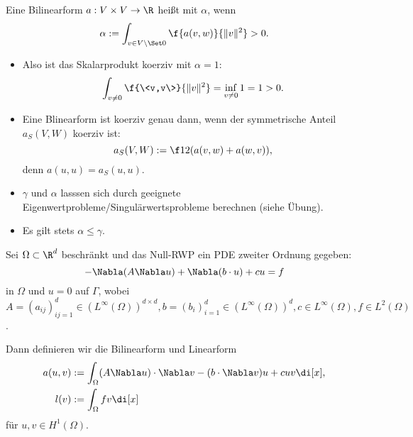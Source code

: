 \begin{df}[Koerzivität] \label{3.20}
	Eine Bilinearform $a: V \times V  \to \R$ heißt  mit  $\alpha$, wenn
	\[
		\alpha := \int_{v \in V \setminus \Set 0} \f{a(v,w)}{\|v\|^2} > 0.
	\]
	\begin{note}
		\begin{itemize}
			\item
				Also ist das Skalarprodukt koerziv mit $\alpha = 1$:
				\[
					\int_{v \neq 0} \f{\<v,v\>}{\|v\|^2}
					= \inf_{v \neq 0} 1
					= 1 > 0.
				\]
			\item
				Eine Blinearform ist koerziv genau dann, wenn der symmetrische Anteil $a_S(V,W)$ koerziv ist:
				\[
					a_S(V,W) := \f 12 (a(v,w) + a(w,v)),
				\]
				denn $a(u,u) = a_S(u,u)$.
			\item
				$\gamma$ und $\alpha$ lasssen sich durch geeignete Eigenwertprobleme/Singulärwertsprobleme berechnen (siehe Übung).
			\item
				Es gilt stets $\alpha \le \gamma$.
		\end{itemize}
	\end{note}
\end{df}

\begin{df} \label{3.21}
	Sei $\Omega \subset \R^d$ beschränkt und das Null-RWP ein PDE zweiter Ordnung gegeben:
	\[
		-\Nabla (A \Nabla u) + \Nabla (b \cdot u) + c u = f
	\]
	in $\Omega$ und $u = 0$ auf $\Gamma$, wobei $A = (a_{ij})_{ij=1}^d \in (L^\infty(\Omega))^{d\times d}, b = (b_i)_{i=1}^d \in (L^\infty(\Omega))^d, c \in L^\infty(\Omega), f \in L^2(\Omega)$.

	Dann definieren wir die Bilinearform und Linearform
	\begin{align} \label{eq:3.4}
		a(u,v) &:= \int_\Omega (A \Nabla u) \cdot \Nabla v - (b \cdot \Nabla v) u + c u v \di[x], \\
		l(v) &:= \int_\Omega f v \di[x] \notag
	\end{align}
	für $u, v \in H^1(\Omega)$.
\end{df}

